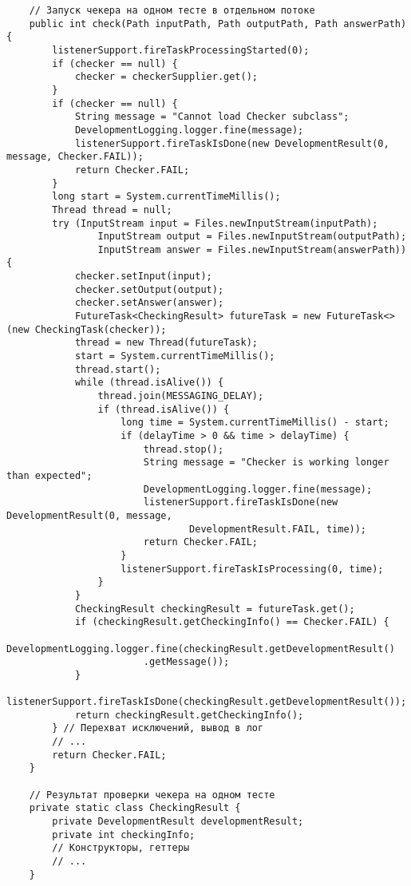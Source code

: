 \begin{verbatim}
    // Запуск чекера на одном тесте в отдельном потоке
    public int check(Path inputPath, Path outputPath, Path answerPath) {
        listenerSupport.fireTaskProcessingStarted(0);
        if (checker == null) {
            checker = checkerSupplier.get();
        }
        if (checker == null) {
            String message = "Cannot load Checker subclass";
            DevelopmentLogging.logger.fine(message);
            listenerSupport.fireTaskIsDone(new DevelopmentResult(0, message, Checker.FAIL));
            return Checker.FAIL;
        }
        long start = System.currentTimeMillis();
        Thread thread = null;
        try (InputStream input = Files.newInputStream(inputPath);
                InputStream output = Files.newInputStream(outputPath);
                InputStream answer = Files.newInputStream(answerPath)) {
            checker.setInput(input);
            checker.setOutput(output);
            checker.setAnswer(answer);
            FutureTask<CheckingResult> futureTask = new FutureTask<>(new CheckingTask(checker));
            thread = new Thread(futureTask);
            start = System.currentTimeMillis();
            thread.start();
            while (thread.isAlive()) {
                thread.join(MESSAGING_DELAY);
                if (thread.isAlive()) {
                    long time = System.currentTimeMillis() - start;
                    if (delayTime > 0 && time > delayTime) {
                        thread.stop();
                        String message = "Checker is working longer than expected";
                        DevelopmentLogging.logger.fine(message);
                        listenerSupport.fireTaskIsDone(new DevelopmentResult(0, message,
                                DevelopmentResult.FAIL, time));
                        return Checker.FAIL;
                    }
                    listenerSupport.fireTaskIsProcessing(0, time);
                }
            }
            CheckingResult checkingResult = futureTask.get();
            if (checkingResult.getCheckingInfo() == Checker.FAIL) {
                DevelopmentLogging.logger.fine(checkingResult.getDevelopmentResult()
                        .getMessage());
            }
            listenerSupport.fireTaskIsDone(checkingResult.getDevelopmentResult());
            return checkingResult.getCheckingInfo();
        } // Перехват исключений, вывод в лог
        // ...
        return Checker.FAIL;
    }

    // Результат проверки чекера на одном тесте
    private static class CheckingResult {
        private DevelopmentResult developmentResult;
        private int checkingInfo;
        // Конструкторы, геттеры
        // ...
    }


\end{verbatim}
